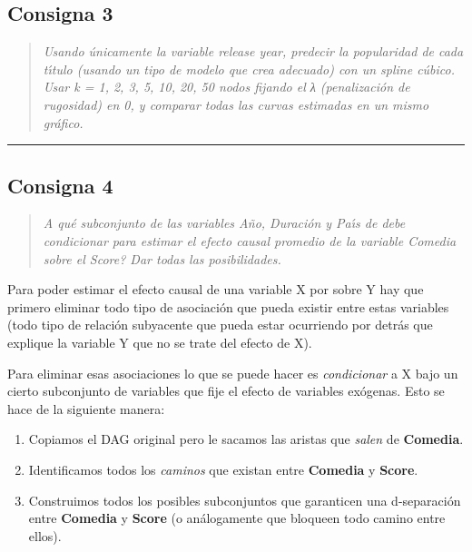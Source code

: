 \documentclass[
]{article}
\providecommand{\tightlist}{%
  \setlength{\itemsep}{0pt}\setlength{\parskip}{0pt}}
\begin{document}
\subsection{Consigna 3}\label{consigna-3}

\begin{quote}
\emph{Usando únicamente la variable release year, predecir la
popularidad de cada tı́tulo (usando un tipo de modelo que crea adecuado)
con un spline cúbico. Usar k = 1, 2, 3, 5, 10, 20, 50 nodos fijando el λ
(penalización de rugosidad) en 0, y comparar todas las curvas estimadas
en un mismo gráfico.}
\end{quote}

\begin{center}\rule{0.5\linewidth}{0.5pt}\end{center}

\subsection{Consigna 4}\label{consigna-4}

\begin{quote}
\emph{A qué subconjunto de las variables Año, Duración y Paı́s de debe
condicionar para estimar el efecto causal promedio de la variable
Comedia sobre el Score? Dar todas las posibilidades.}
\end{quote}

Para poder estimar el efecto causal de una variable X por sobre Y hay
que primero eliminar todo tipo de asociación que pueda existir entre
estas variables (todo tipo de relación subyacente que pueda estar
ocurriendo por detrás que explique la variable Y que no se trate del
efecto de X).

Para eliminar esas asociaciones lo que se puede hacer es
\emph{condicionar} a X bajo un cierto subconjunto de variables que fije
el efecto de variables exógenas. Esto se hace de la siguiente manera:

\begin{enumerate}
\def\labelenumi{\arabic{enumi}.}
\tightlist
\item
  Copiamos el DAG original pero le sacamos las aristas que \emph{salen}
  de \textbf{Comedia}.
\item
  Identificamos todos los \emph{caminos} que existan entre
  \textbf{Comedia} y \textbf{Score}.
\item
  Construimos todos los posibles subconjuntos que garanticen una
  d-separación entre \textbf{Comedia} y \textbf{Score} (o análogamente
  que bloqueen todo camino entre ellos).
\end{enumerate}
\end{document}
